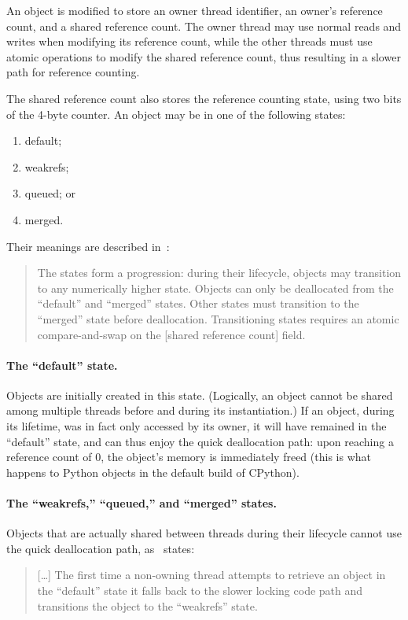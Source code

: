 An object is modified to store an owner thread identifier, an owner's reference count, and a shared reference count.
The owner thread may use normal reads and writes when modifying its reference count, while the other threads must use atomic operations to modify the shared reference count, thus resulting in a slower path for reference counting.

The shared reference count also stores the reference counting state, using two bits of the 4-byte counter.
An object may be in one of the following states:
\begin{enumerate}
    \item default;
    \item weakrefs;
    \item queued; or
    \item merged.
\end{enumerate}
Their meanings are described in~\cite[\S Biased Reference Counting]{pep703}:
\begin{quote}
    The states form a progression: during their lifecycle, objects may transition to any numerically higher state.
    Objects can only be deallocated from the ``default'' and ``merged'' states.
    Other states must transition to the ``merged'' state before deallocation.
    Transitioning states requires an atomic compare-and-swap on the [shared reference count] field.
\end{quote}

\paragraph{The ``default'' state.}
Objects are initially created in this state.
(Logically, an object cannot be shared among multiple threads before and during its instantiation.)
If an object, during its lifetime, was in fact only accessed by its owner, it will have remained in the ``default'' state, and can thus enjoy the quick deallocation path: upon reaching a reference count of 0, the object's memory is immediately freed (this is what happens to Python objects in the default build of CPython).

\paragraph{The ``weakrefs,'' ``queued,'' and ``merged'' states.}
Objects that are actually shared between threads during their lifecycle cannot use the quick deallocation path, as~\cite[]{pep703} states:
\begin{quote}
    [\ldots] The first time a non-owning thread attempts to retrieve an object in the ``default'' state it falls back to the slower locking code path and transitions the object to the ``weakrefs'' state.
\end{quote}

